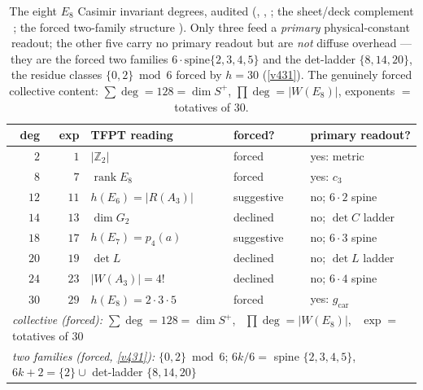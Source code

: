 \documentclass[11pt,a4paper]{article}
\newcommand{\cthree}{c_3}
\newcommand{\gcar}{g_{\mathrm{car}}}
\providecommand{\Z}{\mathbb{Z}}
\begin{document}
\begin{table}[h]\centering\footnotesize
\caption{The eight $E_8$ Casimir invariant degrees, audited (, , ; the sheet/deck complement ; the forced two-family structure ). Only three feed a \emph{primary} physical-constant readout; the other five carry no primary readout but are \emph{not} diffuse overhead --- they are the forced two families $6\cdot\text{spine}\{2,3,4,5\}$ and the det-ladder $\{8,14,20\}$, the residue classes $\{0,2\}\bmod6$ forced by $h=30$ (\vref{v431}). The genuinely forced collective content: $\sum\deg = 128 = \dim S^+$, $\prod\deg = |W(E_8)|$, exponents $=$ totatives of $30$.}
\label{tab:e8-degree-audit}
\begin{tabular}{r r l l l}
\toprule
deg & exp & TFPT reading & forced? & primary readout? \\
\midrule
$2$  & $1$  & $|\Z_2|$                & forced     & yes: metric \\
$8$  & $7$  & $\operatorname{rank}E_8$ & forced     & yes: $\cthree$ \\
$12$ & $11$ & $h(E_6)=|R(A_3)|$        & suggestive & no; $6{\cdot}2$ spine \\
$14$ & $13$ & $\dim G_2$               & declined   & no; $\det C$ ladder \\
$18$ & $17$ & $h(E_7)=p_4(a)$          & suggestive & no; $6{\cdot}3$ spine \\
$20$ & $19$ & $\det L$                 & declined   & no; $\det L$ ladder \\
$24$ & $23$ & $|W(A_3)|=4!$            & declined   & no; $6{\cdot}4$ spine \\
$30$ & $29$ & $h(E_8)=2{\cdot}3{\cdot}5$ & forced   & yes: $\gcar$ \\
\midrule
\multicolumn{5}{l}{\footnotesize\emph{collective (forced):} $\sum\deg=128=\dim S^+$, \ $\prod\deg=|W(E_8)|$, \ $\exp=$ totatives of $30$} \\
\multicolumn{5}{l}{\footnotesize\emph{two families (forced, \vref{v431}):} $\{0,2\}\bmod6$; $6k/6=$ spine $\{2,3,4,5\}$, \ $6k{+}2=\{2\}\cup$ det-ladder $\{8,14,20\}$} \\
\bottomrule
\end{tabular}
\end{table}
\end{document}
